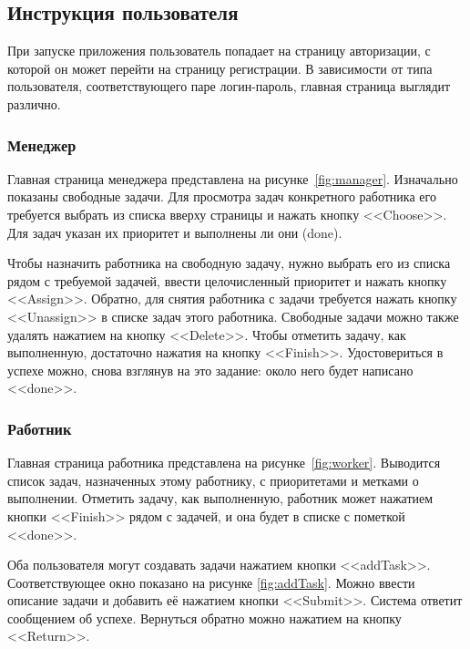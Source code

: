 \subsection{Инструкция пользователя}
При запуске приложения пользователь попадает на страницу авторизации, с которой он может перейти на страницу регистрации. В зависимости от типа пользователя, соответствующего паре логин-пароль, главная страница выглядит различно.

\subsubsection{Менеджер}
Главная страница менеджера представлена на рисунке~\ref{fig:manager}. Изначально показаны свободные задачи. Для просмотра задач конкретного работника его требуется выбрать из списка вверху страницы и нажать кнопку <<Choose>>. Для задач указан их приоритет и выполнены ли они (done).

Чтобы назначить работника на свободную задачу, нужно выбрать его из списка рядом с требуемой задачей, ввести целочисленный приоритет и нажать кнопку <<Assign>>. Обратно, для снятия работника с задачи требуется нажать кнопку <<Unassign>> в списке задач этого работника. Свободные задачи можно также удалять нажатием на кнопку <<Delete>>. Чтобы отметить задачу, как выполненную, достаточно нажатия на кнопку <<Finish>>. Удостовериться в успехе можно, снова взглянув на это задание: около него будет написано <<done>>.

\subsubsection{Работник}
Главная страница работника представлена на рисунке~\ref{fig:worker}. Выводится список задач, назначенных этому работнику, с приоритетами и метками о выполнении. Отметить задачу, как выполненную, работник может нажатием кнопки <<Finish>> рядом с задачей, и она будет в списке с пометкой <<done>>.

Оба пользователя могут создавать задачи нажатием кнопки <<addTask>>. Соответствующее окно показано на рисунке \ref{fig:addTask}. Можно ввести описание задачи и добавить её нажатием кнопки <<Submit>>. Система ответит сообщением об успехе. Вернуться обратно можно нажатием на кнопку <<Return>>.